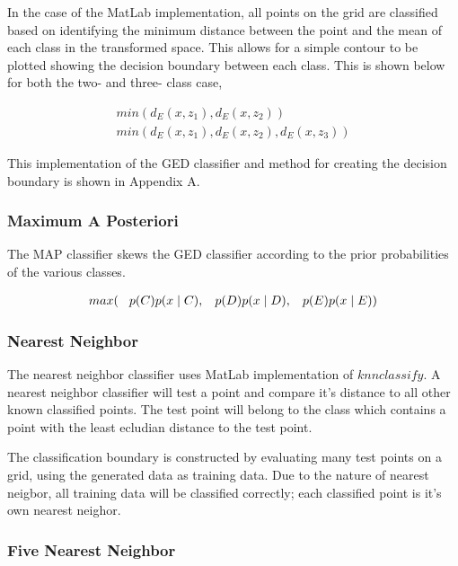 In the case of the MatLab implementation, all points on the grid are classified based on identifying the minimum distance between the point and the mean of each class in the transformed space. This allows for a simple contour to be plotted showing the decision boundary between each class. This is shown below for both the two- and three- class case,

\begin{eqnarray}
\label{eqn:pointClass-GED}
min(d_{E} (x,z_{1}), d_{E} (x,z_{2})) \\
min(d_{E} (x,z_{1}), d_{E} (x,z_{2}), d_{E} (x,z_{3}))
\end{eqnarray}


This implementation of the GED classifier and method for creating the decision boundary is shown in Appendix A.

\subsubsection{Maximum A Posteriori}

The MAP classifier skews the GED classifier according to the prior probabilities of the various classes.

\begin{eqnarray}
max( \hspace{3mm} p(C)p(x\mid C), \hspace{3mm} p(D)p(x\mid D), \hspace{3mm} p(E)p(x\mid E) ) 
\end{eqnarray}


\subsubsection{Nearest Neighbor}

The nearest neighbor classifier uses MatLab implementation of $knnclassify$. A nearest neighbor classifier will test a point and compare it's distance to all other known classified points. The test point will belong to the class which contains a point with the least ecludian distance to the test point.

The classification boundary is constructed by evaluating many test points on a grid, using the generated data as training data. Due to the nature of nearest neigbor, all training data will be classified correctly; each classified point is it's own nearest neighor.

\subsubsection{Five Nearest Neighbor}

